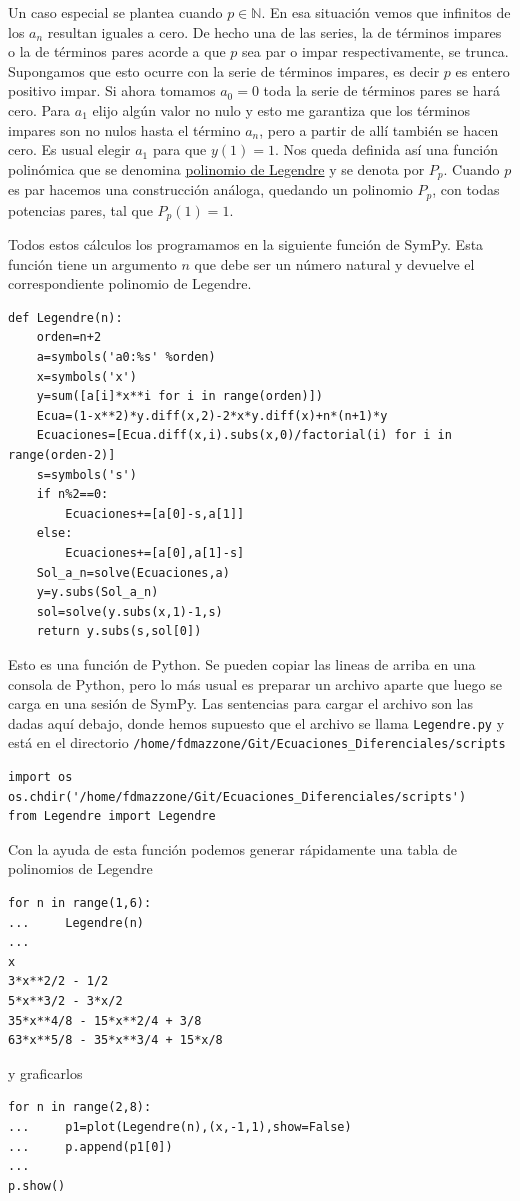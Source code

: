 \begin{ejemplo}{}
Un caso especial se plantea cuando  $p\in\mathbb{N}$. En esa situación vemos que infinitos de los $a_n$ resultan iguales a cero. De hecho una de las series, la de términos impares o la de términos pares acorde a que $p$ sea par o impar respectivamente,  se trunca. Supongamos que esto ocurre con la serie de términos impares, es decir $p$ es entero positivo impar. Si ahora tomamos $a_0=0$ toda la serie de términos pares se hará cero. Para $a_1$ elijo algún valor no nulo y esto me garantiza que los términos impares son no nulos hasta el término $a_{n}$, pero a partir de allí también se hacen cero. Es usual elegir $a_1$ para que $y(1)=1$. Nos queda definida así una función polinómica que se denomina \href{http://es.wikipedia.org/wiki/Polinomios_de_Legendre}{polinomio de Legendre} y se denota por $P_p$. Cuando $p$ es par hacemos una construcción análoga, quedando un polinomio $P_p$, con todas potencias pares, tal que $P_p(1)=1$.

Todos estos cálculos los programamos en la siguiente función de SymPy. Esta función tiene un argumento $n$ que debe ser un número natural y devuelve el correspondiente polinomio de Legendre.


\begin{lstlisting}
def Legendre(n):
    orden=n+2
    a=symbols('a0:%s' %orden)
    x=symbols('x')
    y=sum([a[i]*x**i for i in range(orden)])
    Ecua=(1-x**2)*y.diff(x,2)-2*x*y.diff(x)+n*(n+1)*y
    Ecuaciones=[Ecua.diff(x,i).subs(x,0)/factorial(i) for i in range(orden-2)]
    s=symbols('s')
    if n%2==0:
        Ecuaciones+=[a[0]-s,a[1]]
    else:
        Ecuaciones+=[a[0],a[1]-s]
    Sol_a_n=solve(Ecuaciones,a)
    y=y.subs(Sol_a_n)
    sol=solve(y.subs(x,1)-1,s)
    return y.subs(s,sol[0])
\end{lstlisting}

Esto es una función de Python. Se pueden copiar las lineas de arriba en una consola de Python, pero lo más usual es preparar un archivo aparte que luego se carga en una sesión de SymPy.  Las sentencias para cargar el archivo son las dadas aquí debajo, donde hemos supuesto que el archivo se llama \texttt{Legendre.py} y está en el directorio \texttt{/home/fdmazzone/Git/Ecuaciones\_Diferenciales/scripts}

\begin{lstlisting}
import os
os.chdir('/home/fdmazzone/Git/Ecuaciones_Diferenciales/scripts')
from Legendre import Legendre
\end{lstlisting}


Con la ayuda de esta función podemos generar rápidamente una tabla de polinomios de Legendre
\begin{lstlisting}
for n in range(1,6):
...     Legendre(n)
...
x
3*x**2/2 - 1/2
5*x**3/2 - 3*x/2
35*x**4/8 - 15*x**2/4 + 3/8
63*x**5/8 - 35*x**3/4 + 15*x/8
\end{lstlisting}
y graficarlos
\begin{lstlisting}
for n in range(2,8):
...     p1=plot(Legendre(n),(x,-1,1),show=False)
...     p.append(p1[0])
...
p.show()
\end{lstlisting}



\end{ejemplo}
